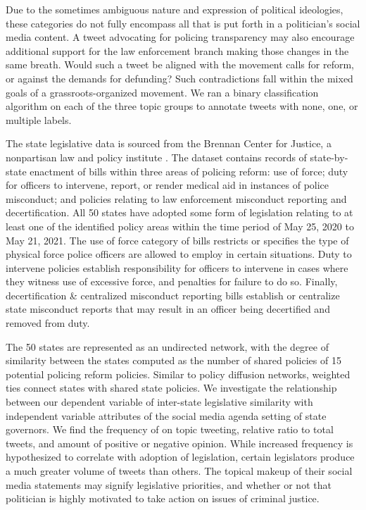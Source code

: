 \documentclass[12pt]{article}
\begin{document}
Due to the sometimes ambiguous nature and expression of political
ideologies, these categories do not fully encompass all that is put
forth in a politician's social media content. A tweet advocating for
policing transparency may also encourage additional support for the law
enforcement branch making those changes in the same breath. Would such a
tweet be aligned with the movement calls for reform, or against the
demands for defunding? Such contradictions fall within the mixed goals
of a grassroots-organized movement. We ran a binary classification
algorithm on each of the three topic groups to annotate tweets with
none, one, or multiple labels.

The state legislative data is sourced from the Brennan Center for
Justice, a nonpartisan law and policy institute \citep{Brennan}. The
dataset contains records of state-by-state enactment of bills within
three areas of policing reform: use of force; duty for officers to
intervene, report, or render medical aid in instances of police
misconduct; and policies relating to law enforcement misconduct
reporting and decertification. All 50 states have adopted some form of
legislation relating to at least one of the identified policy areas
within the time period of May 25, 2020 to May 21, 2021. The use of force
category of bills restricts or specifies the type of physical force
police officers are allowed to employ in certain situations. Duty to
intervene policies establish responsibility for officers to intervene in
cases where they witness use of excessive force, and penalties for
failure to do so. Finally, decertification \& centralized misconduct
reporting bills establish or centralize state misconduct reports that
may result in an officer being decertified and removed from duty.

The 50 states are represented as an undirected network, with the degree
of similarity between the states computed as the number of shared
policies of 15 potential policing reform policies. Similar to policy
diffusion networks, weighted ties connect states with shared state
policies. We investigate the relationship between our dependent variable
of inter-state legislative similarity with independent variable
attributes of the social media agenda setting of state governors. We
find the frequency of on topic tweeting, relative ratio to total tweets,
and amount of positive or negative opinion. While increased frequency is
hypothesized to correlate with adoption of legislation, certain
legislators produce a much greater volume of tweets than others. The
topical makeup of their social media statements may signify legislative
priorities, and whether or not that politician is highly motivated to
take action on issues of criminal justice.
\end{document}
